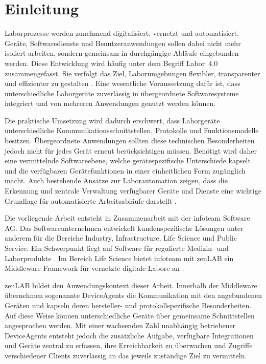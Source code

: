 \chapter{Einleitung}\label{ch:intro}

Laborprozesse werden zunehmend digitalisiert, vernetzt und automatisiert. Geräte, Softwaredienste und Benutzeranwendungen sollen dabei nicht mehr isoliert arbeiten, sondern gemeinsam in durchgängige Abläufe eingebunden werden. Diese Entwicklung wird häufig unter dem Begriff Labor~4.0 zusammengefasst. Sie verfolgt das Ziel, Laborumgebungen flexibler, transparenter und effizienter zu gestalten \cite{fraunhoferLabor40}. Eine wesentliche Voraussetzung dafür ist, dass unterschiedliche Laborgeräte zuverlässig in übergeordnete Softwaresysteme integriert und von mehreren Anwendungen genutzt werden können.

Die praktische Umsetzung wird dadurch erschwert, dass Laborgeräte unterschiedliche Kommunikationsschnittstellen, Protokolle und Funktionsmodelle besitzen. Übergeordnete Anwendungen sollten diese technischen Besonderheiten jedoch nicht für jedes Gerät erneut berücksichtigen müssen. Benötigt wird daher eine vermittelnde Softwareebene, welche gerätespezifische Unterschiede kapselt und die verfügbaren Gerätefunktionen in einer einheitlichen Form zugänglich macht. Auch bestehende Ansätze zur Laborautomation zeigen, dass die Erkennung und zentrale Verwaltung verfügbarer Geräte und Dienste eine wichtige Grundlage für automatisierte Arbeitsabläufe darstellt \cite{bromig2022sila}.

Die vorliegende Arbeit entsteht in Zusammenarbeit mit der infoteam Software AG. Das Softwareunternehmen entwickelt kundenspezifische Lösungen unter anderem für die Bereiche Industry, Infrastructure, Life Science und Public Service. Ein Schwerpunkt liegt auf Software für regulierte Medizin- und Laborprodukte \cite{infoteamUnternehmen}. Im Bereich Life Science bietet infoteam mit zenLAB ein Middleware-Framework für vernetzte digitale Labore an \cite{infoteamLifeScience}.

zenLAB bildet den Anwendungskontext dieser Arbeit. Innerhalb der Middleware übernehmen sogenannte DeviceAgents die Kommunikation mit den angebundenen Geräten und kapseln deren hersteller- und protokollspezifische Besonderheiten. Auf diese Weise können unterschiedliche Geräte über gemeinsame Schnittstellen angesprochen werden. Mit einer wachsenden Zahl unabhängig betriebener DeviceAgents entsteht jedoch die zusätzliche Aufgabe, verfügbare Integrationen und Geräte zentral zu erfassen, ihre Erreichbarkeit zu überwachen und Zugriffe verschiedener Clients zuverlässig an das jeweils zuständige Ziel zu vermitteln.

